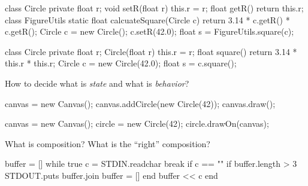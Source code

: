 \documentclass{article}
\begin{document}
\begin{pptWide}{2}
{\small\begin{ffcode}
class Circle {
  private float r;
  void setR(float r) { this.r = r; }
  float getR() { return this.r; }
}
class FigureUtils {
  static float calcuateSquare(Circle c) {
    return 3.14 * c.getR() * c.getR();
  }
}
Circle c = new Circle();
c.setR(42.0);
float s = FigureUtils.square(c);
\end{ffcode}
}
\par\columnbreak\par
{\small\begin{ffcode}
class Circle {
  private float r;
  Circle(float r) { this.r = r; }
  float square() {
    return 3.14 * this.r * this.r;
  }
}
Circle c = new Circle(42.0);
float s = c.square();
\end{ffcode}
}\par
How to decide what is \emph{state} and what is \emph{behavior}?
\end{pptWide}
\plush{}

\begin{pptWide}{2}
{\small\begin{ffcode}
canvas = new Canvas();
canvas.addCircle(new Circle(42));
canvas.draw();
\end{ffcode}
}
\par\columnbreak\par
{\small\begin{ffcode}
canvas = new Canvas();
circle = new Circle(42);
circle.drawOn(canvas);
\end{ffcode}
}\par
\end{pptWide}
What is composition? What is the ``right'' composition?
\plush{}


\begin{pptWide}{2}
{\small\begin{ffcode}
buffer = []
while true
  c = STDIN.readchar
  break if c == "\n"
  if buffer.length > 3
    STDOUT.puts buffer.join
    buffer = []
  end
  buffer << c
end
\end{ffcode}
}
\par\columnbreak\par
{\small{}
}
\end{pptWide}
\plush{}
\end{document}

